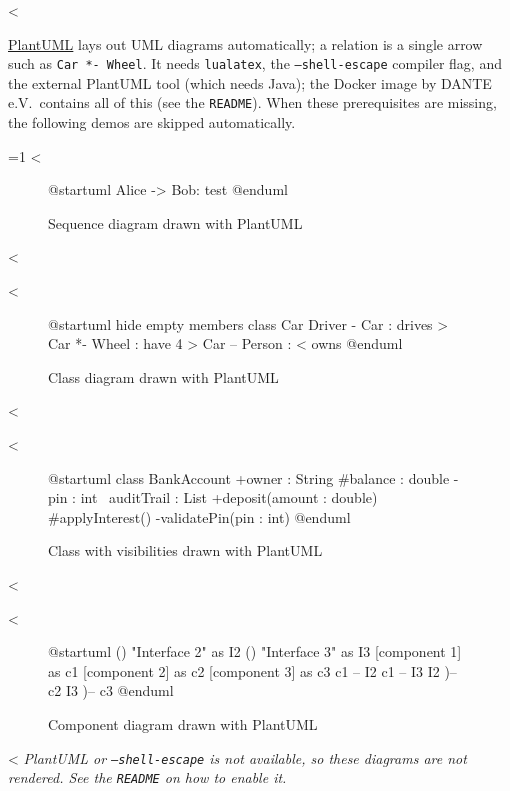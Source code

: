 <%

\href{https://plantuml.com}{PlantUML} lays out UML diagrams automatically; a relation is a single arrow such as \texttt{Car *- Wheel}.
It needs \texttt{lualatex}, the \texttt{--shell-escape} compiler flag, and the external PlantUML tool (which needs Java); the Docker image by DANTE e.V.\ contains all of this (see the \texttt{README}).
When these prerequisites are missing, the following demos are skipped automatically.

\ifluatex
  \ifnum{}=1
    <%
    \begin{figure}
      \centering
      \begin{plantuml}
@startuml
Alice -> Bob: test
@enduml
\end{plantuml}
      \caption{Sequence diagram drawn with PlantUML}
      \label{fig:plantuml-sequence}
    \end{figure}
    <%

    <%
    \begin{figure}
      \centering
      \begin{plantuml}
@startuml
hide empty members
class Car
Driver - Car : drives >
Car *- Wheel : have 4 >
Car -- Person : < owns
@enduml
\end{plantuml}
      \caption{Class diagram drawn with PlantUML}
      \label{fig:plantuml-class-relations}
    \end{figure}
    <%

    <%
    \begin{figure}
      \centering
      \begin{plantuml}
@startuml
class BankAccount {
  +owner : String
  #balance : double
  -pin : int
  ~auditTrail : List
  +deposit(amount : double)
  #applyInterest()
  -validatePin(pin : int)
}
@enduml
\end{plantuml}
      \caption{Class with visibilities drawn with PlantUML}
      \label{fig:plantuml-class-visibility}
    \end{figure}
    <%

    <%
    \begin{figure}
      \centering
      \begin{plantuml}
@startuml
() "Interface 2" as I2
() "Interface 3" as I3
[component 1] as c1
[component 2] as c2
[component 3] as c3
c1 -- I2
c1 -- I3
I2 )-- c2
I3 )-- c3
@enduml
\end{plantuml}
      \caption{Component diagram drawn with PlantUML}
      \label{fig:plantuml-component}
    \end{figure}
    <%
  \else
    \emph{PlantUML or \texttt{--shell-escape} is not available, so these diagrams are not rendered. See the \texttt{README} on how to enable it.}
  \fi
\fi
